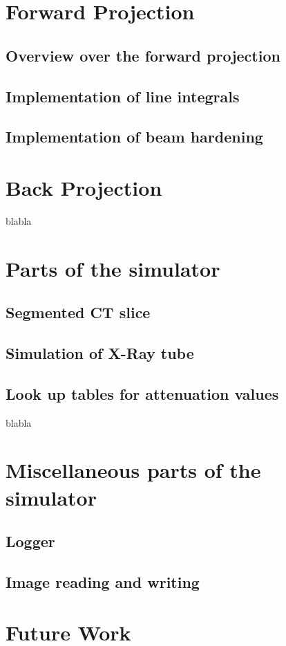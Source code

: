 \section{Forward Projection}
\subsection{Overview over the forward projection}
\subsection{Implementation of line integrals}
\subsection{Implementation of beam hardening}
\section{Back Projection}
blabla\cite{CUDABackprojection}
\section{Parts of the simulator}
\subsection{Segmented CT slice}
\subsection{Simulation of X-Ray tube}
\subsection{Look up tables for attenuation values}
blabla\cite{AttenuationTable}
\section{Miscellaneous parts of the simulator}
\subsection{Logger}
\subsection{Image reading and writing}
\section{Future Work}
